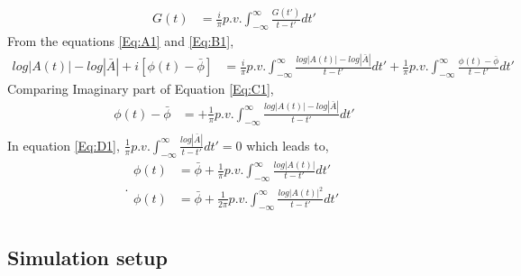 \begin{equation}
\begin{split}
G(t) &=\frac{i}{\pi} p.v. \int_{-\infty}^{\infty} \frac{G(t')}{t-t'} dt' 
\end{split}
\label{Eq:B1}
\end{equation}
From the equations \ref{Eq:A1} and \ref{Eq:B1},
\begin{equation}
\begin{split}
log|A(t)|-log|\bar{A}|+i[\phi(t)-\bar{\phi}] &=\frac{i}{\pi} p.v. \int_{-\infty}^{\infty} \frac{log|A(t)|-log|\bar{A}|}{t-t'} dt' + \frac{1}{\pi} p.v. \int_{-\infty}^{\infty} \frac{\phi(t)-\bar{\phi}}{t-t'} dt' 
\end{split}
\label{Eq:C1}
\end{equation}
Comparing Imaginary part of Equation \ref{Eq:C1},
\begin{equation}
\begin{split}
\phi(t)-\bar{\phi} &= + \frac{1}{\pi} p.v. \int_{-\infty}^{\infty} \frac{log|A(t)|-log|\bar{A}|}{t-t'} dt'\\
\end{split}
\label{Eq:D1}
\end{equation}
In equation \ref{Eq:D1}, $\frac{1}{\pi} p.v. \int_{-\infty}^{\infty} \frac{log|\bar{A}|}{t-t'} dt'=0$ which leads to,
\begin{equation}.
\begin{split}
\phi(t) &= \bar{\phi} + \frac{1}{\pi} p.v. \int_{-\infty}^{\infty} \frac{log|A(t)|}{t-t'} dt'\\
\phi(t) &= \bar{\phi} + \frac{1}{2\pi} p.v. \int_{-\infty}^{\infty} \frac{log|A(t)|^2}{t-t'} dt'\\
\end{split}
\label{Eq:E1}
\end{equation}
\newpage
\subsection{Simulation setup}
